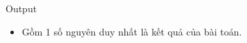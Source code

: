 Output
\begin{itemize}
	\item     Gồm 1 số nguyên duy nhất là kết quả của bài toán.   
\end{itemize}